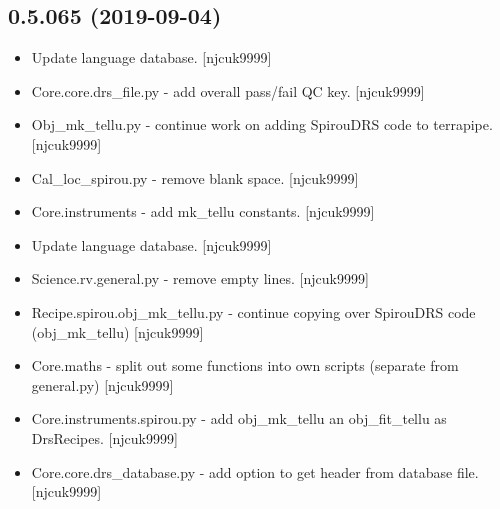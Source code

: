 \documentclass[a4paper,10pt,english]{report}
\begin{document}
\subsection{0.5.065 (2019-09-04)}
\label{\detokenize{misc/changelog:id76}}\begin{itemize}
\item {} 
Update language database. {[}njcuk9999{]}

\item {} 
Core.core.drs\_file.py - add overall pass/fail QC key. {[}njcuk9999{]}

\item {} 
Obj\_mk\_tellu.py - continue work on adding SpirouDRS code to terrapipe.
{[}njcuk9999{]}

\item {} 
Cal\_loc\_spirou.py - remove blank space. {[}njcuk9999{]}

\item {} 
Core.instruments - add mk\_tellu constants. {[}njcuk9999{]}

\item {} 
Update language database. {[}njcuk9999{]}

\item {} 
Science.rv.general.py - remove empty lines. {[}njcuk9999{]}

\item {} 
Recipe.spirou.obj\_mk\_tellu.py - continue copying over SpirouDRS code
(obj\_mk\_tellu) {[}njcuk9999{]}

\item {} 
Core.maths - split out some functions into own scripts (separate from
general.py) {[}njcuk9999{]}

\item {} 
Core.instruments.spirou.py - add obj\_mk\_tellu an obj\_fit\_tellu as
DrsRecipes. {[}njcuk9999{]}

\item {} 
Core.core.drs\_database.py - add option to get header from database
file. {[}njcuk9999{]}

\end{itemize}
\end{document}
